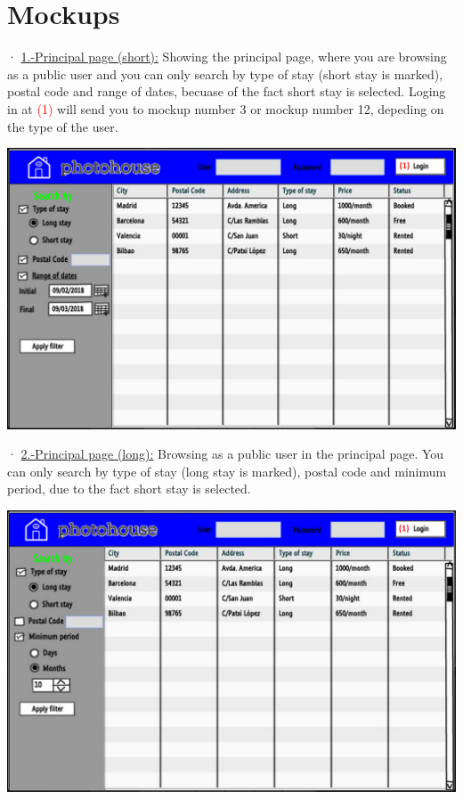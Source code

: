 \documentclass[12pt]{article}
\begin{document}
{\section{Mockups}
· \underline{1.-Principal page (short):} Showing the principal page, where you are browsing as a public user and you can only search by type of stay (short stay is marked), postal code and range of dates, becuase of the fact short stay is selected. Loging in at \textcolor{red}{(1)} will send you to mockup number 3 or mockup number 12, depeding on the type of the user. 
\begin{center}
	\includegraphics[scale=.7]{principal_short.PNG}
\end{center}

\newpage
· \underline{2.-Principal page (long):} Browsing as a public user in the principal page. You can only search by type of stay (long stay is marked), postal code and minimum period, due to the fact short stay is selected. 
\begin{center}
	\includegraphics[scale=.7]{principal_long.PNG}
\end{center}


}
\end{document}
